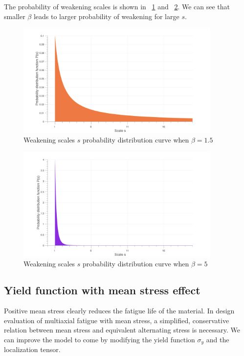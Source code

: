 \documentclass[3p,times,procedia,number]{elsarticle}
\newcommand{\figref}[1]{\figurename~\ref{#1}}
\begin{document}
The probability of weakening scales is shown in \figref{ps1} and \figref{ps2}. We can see that smaller $\beta$ leads to larger probability of weakening for large $s$.
\begin{figure}[!h]
\centering
\includegraphics[width=0.9\textwidth]{figures//ps1.png} 
\caption{Weakening scales $s$ probability distribution curve when $\beta=1.5$ }
\label{ps1}
\end{figure}
\begin{figure}[!h]
\centering
\includegraphics[width=0.9\textwidth]{figures//ps2.png} 
\caption{Weakening scales $s$ probability distribution curve when $\beta=5$ }
\label{ps2}
\end{figure}

\newpage
\subsection{Yield function with mean stress effect}
\label{sec:5.4.3}
Positive mean stress clearly reduces the fatigue life of the material. In design evaluation of multiaxial fatigue with mean stress, a simplified, conservative relation between mean stress and equivalent alternating stress is necessary. We can improve the model to come by modifying the yield function $\sigma_y$ and the localization tensor.
\end{document}
